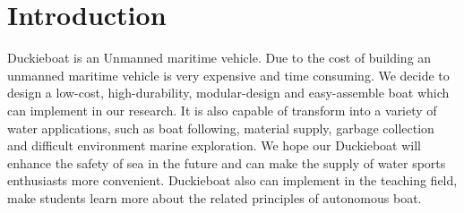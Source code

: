 \section{Introduction}

Duckieboat is an Unmanned maritime vehicle. Due to the cost of building an unmanned maritime vehicle is very expensive and time consuming. We decide to design a low-cost, high-durability, modular-design and easy-assemble boat which can implement in our research. It is also capable of transform into a variety of water applications, such as boat following, material supply, garbage collection and difficult environment marine exploration. We hope our Duckieboat will enhance the safety of sea in the future and can make the supply of water sports enthusiasts more convenient. Duckieboat also can implement in the teaching field, make students learn more about the related principles of autonomous boat.
